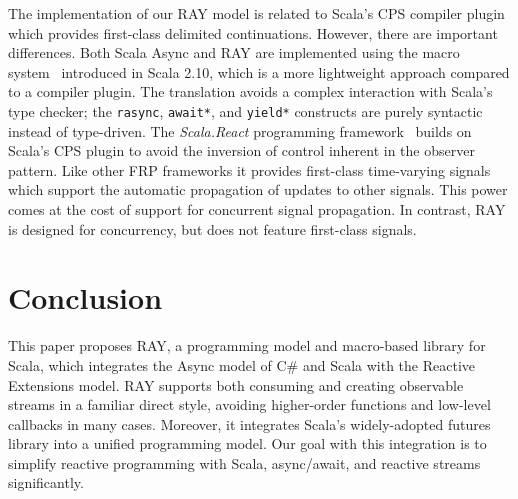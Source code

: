\documentclass{acm_proc_article-sp}
\begin{document}
The implementation of our RAY model is related to Scala's CPS compiler
plugin~\cite{RompfMO09} which provides first-class delimited continuations.
However, there are important differences. Both Scala Async and RAY are
implemented using the macro system~\cite{burmako13} introduced in Scala 2.10,
which is a more lightweight approach compared to a compiler plugin. The
translation avoids a complex interaction with Scala's type checker; the
\verb|rasync|, \verb|await*|, and \verb|yield*| constructs are purely
syntactic instead of type-driven. The {\em Scala.React} programming
framework~\cite{MaierO13} builds on Scala's CPS plugin to avoid the inversion
of control inherent in the observer pattern. Like other FRP frameworks it
provides first-class time-varying signals which support the automatic
propagation of updates to other signals. This power comes at the cost of
support for concurrent signal propagation. In contrast, RAY is designed for
concurrency, but does not feature first-class signals.


\section{Conclusion}

This paper proposes RAY, a programming model and macro-based library for
Scala, which integrates the Async model of C\# and Scala with the Reactive
Extensions model. RAY supports both consuming and creating observable streams
in a familiar direct style, avoiding higher-order functions and low-level
callbacks in many cases. Moreover, it integrates Scala's widely-adopted
futures library into a unified programming model. Our goal with this
integration is to simplify reactive programming with Scala, async/await, and
reactive streams significantly.


%

%
%


\end{document}
